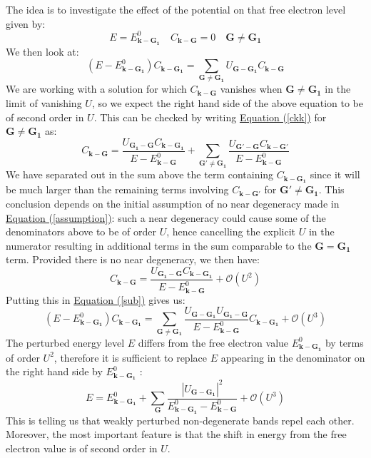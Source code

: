 \documentclass[10.75pt,a4paper,openright,bottom=2cm]{article}
\renewcommand{\Vec}[1]{\boldsymbol{#1}}
\renewcommand{\refeq}[1]{\hyperref[#1]{Equation (\ref{#1})}}
\begin{document}
The idea is to investigate the effect of the potential on that free electron level given by:
\[
E=E^0_{\Vec{k}-\Vec{G_1}} \quad C_{\Vec{k}-\Vec{G}}=0 \quad \Vec{G}\neq\Vec{G_1}
\]
We then look at:
\begin{equation}
\label{sub}
(E-E^0_{\Vec{k}-\Vec{G_1}})C_{\Vec{k}-\Vec{G_1}}=\sum_{\Vec{G}\neq\Vec{G_1}}U_{\Vec{G}-\Vec{G_1}}C_{\Vec{k}-\Vec{G}}
\end{equation}
We are working with a solution for which $C_{\Vec{k}-\Vec{G}}$ vanishes when $\Vec{G}\neq\Vec{G_1}$ in the limit of vanishing $U$, so we expect the right hand side of the above equation to be of second order in $U$. This can be checked by writing \hyperref[ckk]{Equation (\ref{ckk})} for $\Vec{G}\neq\Vec{G_1}$ as:
\[
C_{\Vec{k}-\Vec{G}}=\frac{U_{\Vec{G_1}-\Vec{G}}C_{\Vec{k}-\Vec{G_1}}}{E-E^0_{\Vec{k}-\Vec{G}}}+\sum_{\Vec{G'}\neq\Vec{G_1}}\frac{U_{\Vec{G'}-\Vec{G}}C_{\Vec{k}-\Vec{G'}}}{E-E^0_{\Vec{k}-\Vec{G}}}
\]
We have separated out in the sum above the term containing $C_{\Vec{k}-\Vec{G_1}}$ since it will be much larger than the remaining terms involving $C_{\Vec{k}-\Vec{G'}}$ for $\Vec{G'}\neq\Vec{G_1}$. This conclusion depends on the initial assumption of no near degeneracy made in \refeq{assumption}: such a near degeneracy could cause some of the denominators above to be of order $U$, hence cancelling the explicit $U$ in the numerator resulting in additional terms in the sum comparable to the $\Vec{G}=\Vec{G_1}$ term. Provided there is no near degeneracy, we then have:
\[
C_{\Vec{k}-\Vec{G}}=\frac{U_{\Vec{G_1}-\Vec{G}}C_{\Vec{k}-\Vec{G_1}}}{E-E^0_{\Vec{k}-\Vec{G}}}+\mathcal{O}(U^2)
\]
Putting this in \refeq{sub} gives us:
\begin{equation}
\label{nodeg}
(E-E^0_{\Vec{k}-\Vec{G_1}})C_{\Vec{k}-\Vec{G_1}}=\sum_{\Vec{G}\neq\Vec{G_1}}\frac{U_{\Vec{G}-\Vec{G_1}}U_{\Vec{G_1}-\Vec{G}}}{E-E^0_{\Vec{k}-\Vec{G}}}C_{\Vec{k}-\Vec{G_1}}+\mathcal{O}(U^3)
\end{equation}
The perturbed energy level $E$ differs from the free electron value $E^0_{\Vec{k}-\Vec{G_1}}$ by terms of order $U^2$, therefore it is sufficient to replace $E$ appearing in the denominator on the right hand side by $E^0_{\Vec{k}-\Vec{G_1}}$ :
\[
E=E^0_{\Vec{k}-\Vec{G_1}}+\sum_{\Vec{G}}\frac{|U_{\Vec{G}-\Vec{G_1}}|^2}{E^0_{\Vec{k}-\Vec{G_1}}-E^0_{\Vec{k}-\Vec{G}}}+\mathcal{O}(U^3)
\]
This is telling us that weakly perturbed non-degenerate bands repel each other. Moreover, the most important feature is that the shift in energy from the free electron value is of second order in $U$.\\\\
\end{document}
